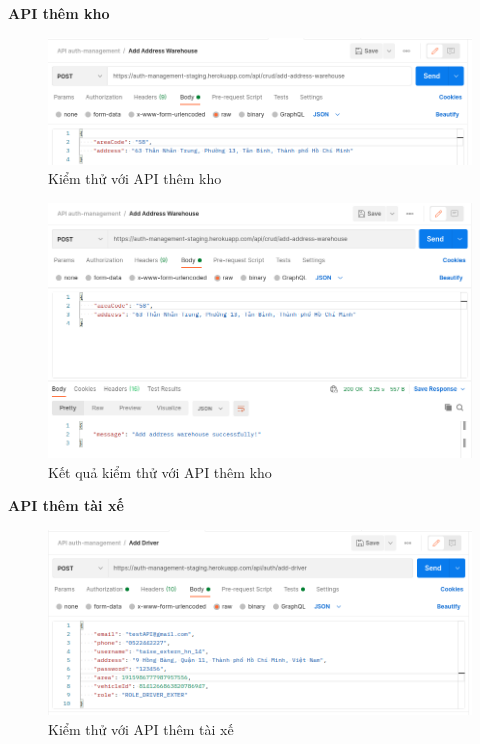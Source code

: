 		\newpage
		\textbf{API thêm kho}
		
		\begin{figure}[H]
			\includegraphics[width=1\textwidth]{Images/testing/API-add-address-warehouse.png}
			\centering
			\linebreak
			\caption{Kiểm thử với API thêm kho}
		\end{figure}
		
		\begin{figure}[H]
			\includegraphics[width=1\textwidth]{Images/testing/API-add-address-warehouse-result.png}
			\centering
			\linebreak
			\caption{Kết quả kiểm thử với API thêm kho}
		\end{figure}	
		
		\newpage
		\textbf{API thêm tài xế}
		
		\begin{figure}[H]
			\includegraphics[width=1\textwidth]{Images/testing/API-add-driver.png}
			\centering
			\linebreak
			\caption{Kiểm thử với API thêm tài xế}
		\end{figure}
		
